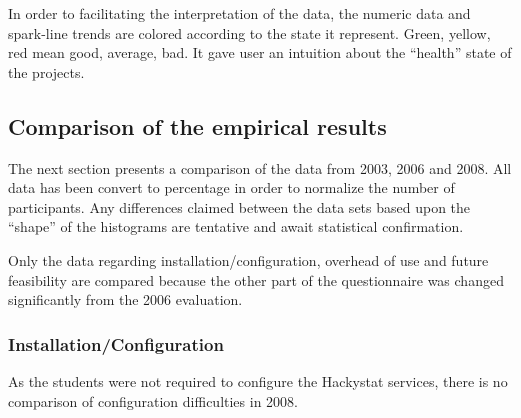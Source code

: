 \documentclass[11pt]{article}
\begin{document}
In order to facilitating the interpretation of the data, the numeric data and spark-line trends are colored according to the state it represent. Green, yellow, red mean good, average, bad. It gave user an intuition about the ``health'' state of the projects.

\subsection {Comparison of the empirical results}
The next section presents a comparison of the data from 2003, 2006 and 2008. All data has been convert to percentage in order to normalize the number of participants. Any differences claimed between the data sets based upon the ``shape'' of the histograms are tentative and await statistical confirmation. 

Only the data regarding installation/configuration, overhead of use and future feasibility are compared because the other part of the questionnaire was changed significantly from the 2006 evaluation.

\subsubsection {Installation/Configuration}
As the students were not required to configure the Hackystat services, there is no comparison of configuration difficulties in 2008.
\end{document}
